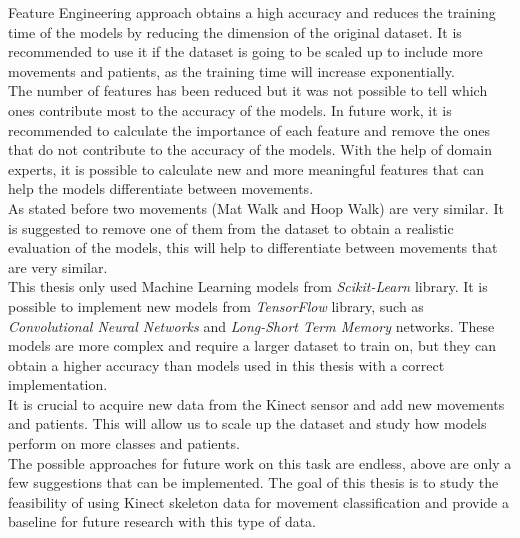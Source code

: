         Feature Engineering approach obtains a high accuracy and reduces the training time of the models by reducing the dimension of the original dataset. It is recommended to use it if the dataset is going to be scaled up to include more movements and patients, as the training time will increase exponentially.\\
        The number of features has been reduced but it was not possible to tell which ones contribute most to the accuracy of the models. In future work, it is recommended to calculate the importance of each feature and remove the ones that do not contribute to the accuracy of the models. With the help of domain experts, it is possible to calculate new and more meaningful features that can help the models differentiate between movements. \\
        As stated before two movements (Mat Walk and Hoop Walk) are very similar. It is suggested to remove one of them from the dataset to obtain a realistic evaluation of the models, this will help to differentiate between movements that are very similar.\\
        
        This thesis only used Machine Learning models from \textit{Scikit-Learn} library. It is possible to implement new models from \textit{TensorFlow} library, such as \textit{Convolutional Neural Networks} and \textit{Long-Short Term Memory} networks. These models are more complex and require a larger dataset to train on, but they can obtain a higher accuracy than models used in this thesis with a correct implementation. \\
        It is crucial to acquire new data from the Kinect sensor and add new movements and patients. This will allow us to scale up the dataset and study how models perform on more classes and patients. \\

        The possible approaches for future work on this task are endless, above are only a few suggestions that can be implemented. The goal of this thesis is to study the feasibility of using Kinect skeleton data for movement classification and provide a baseline for future research with this type of data.

\cleardoublepage